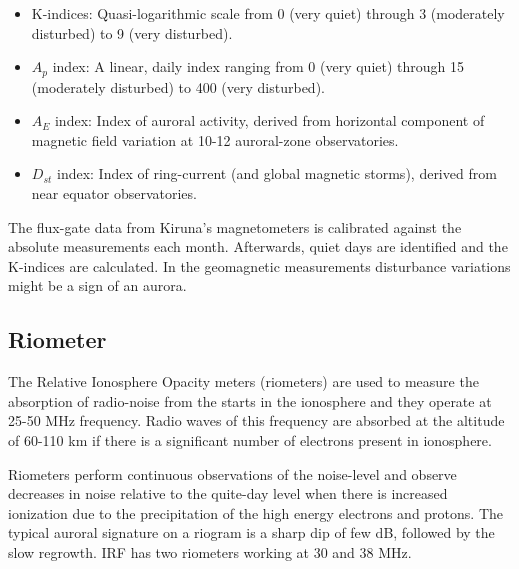 \documentclass{article}
\begin{document}
\begin{itemize}
\item K-indices: Quasi-logarithmic scale from 0 (very quiet) through 3 (moderately disturbed) to 9 (very disturbed).
\item $A_p$ index: A linear, daily index ranging from 0 (very quiet) through 15 (moderately disturbed) to 400 (very disturbed).
\item $A_E$ index: Index of auroral activity, derived from horizontal component of magnetic field variation at 10-12 auroral-zone observatories.
\item $D_{st}$ index: Index of ring-current (and global magnetic storms), derived from near equator observatories.
\end{itemize}

The flux-gate data from Kiruna's magnetometers is calibrated against the absolute measurements each month. Afterwards, quiet days are identified and the K-indices are calculated. In the geomagnetic measurements disturbance variations might be a sign of an aurora.

\subsection{Riometer}
The Relative Ionosphere Opacity meters (riometers) are used to measure the absorption of radio-noise from the starts in the ionosphere and they operate at 25-50 MHz frequency. Radio waves of this frequency are absorbed at the altitude of 60-110 km if there is a significant number of electrons present in ionosphere.

Riometers perform continuous observations of the noise-level and observe decreases in noise relative to the quite-day level when there is increased ionization due to the precipitation of the high energy electrons and protons. The typical auroral signature on a riogram is a sharp dip of few dB, followed by the slow regrowth. IRF has two riometers working at 30 and 38 MHz.
\end{document}

